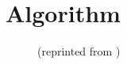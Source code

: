 \section{Algorithm}

\begin{figure}[h!]
 \caption{ (reprinted from \protect\cite{koeppel2008identifying})}
\end{figure}
